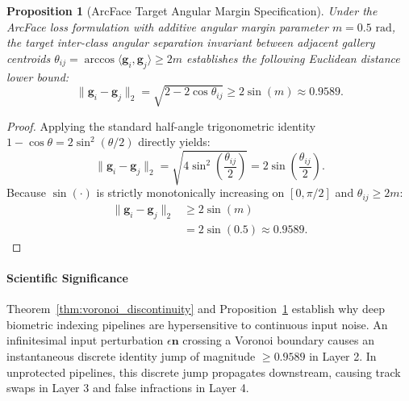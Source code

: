 \documentclass[conference]{IEEEtran}
\newtheorem{proposition}{Proposition}
\begin{document}
\begin{proposition}[ArcFace Target Angular Margin Specification]
\label{prop:arcface_margin}
Under the ArcFace loss formulation with additive angular margin parameter $m = 0.5\text{ rad}$, the target inter-class angular separation invariant between adjacent gallery centroids $\theta_{ij} = \arccos \langle \mathbf{g}_i, \mathbf{g}_j \rangle \ge 2m$ establishes the following Euclidean distance lower bound:
\begin{equation}
\|\mathbf{g}_i - \mathbf{g}_j\|_2 = \sqrt{2 - 2\cos \theta_{ij}} \ge 2\sin(m) \approx 0.9589.
\end{equation}
\end{proposition}

\begin{proof}
Applying the standard half-angle trigonometric identity $1 - \cos \theta = 2\sin^2(\theta/2)$ directly yields:
\begin{equation}
\|\mathbf{g}_i - \mathbf{g}_j\|_2 = \sqrt{4\sin^2\left(\frac{\theta_{ij}}{2}\right)} = 2\sin\left(\frac{\theta_{ij}}{2}\right).
\end{equation}
Because $\sin(\cdot)$ is strictly monotonically increasing on $[0, \pi/2]$ and $\theta_{ij} \ge 2m$:
\begin{align}
\|\mathbf{g}_i - \mathbf{g}_j\|_2 &\ge 2\sin(m) \nonumber \\
&= 2\sin(0.5) \approx 0.9589.
\end{align}
\end{proof}

\paragraph{Scientific Significance} Theorem~\ref{thm:voronoi_discontinuity} and Proposition~\ref{prop:arcface_margin} establish why deep biometric indexing pipelines are hypersensitive to continuous input noise. An infinitesimal input perturbation $\epsilon \mathbf{n}$ crossing a Voronoi boundary causes an instantaneous discrete identity jump of magnitude $\ge 0.9589$ in Layer 2. In unprotected pipelines, this discrete jump propagates downstream, causing track swaps in Layer 3 and false infractions in Layer 4.
\end{document}
